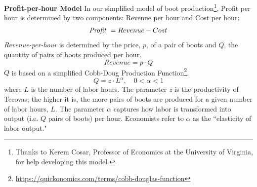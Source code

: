 \documentclass[11pt]{article}
\begin{document}
\pagestyle{otherpages}
\thispagestyle{firstpage}
\vspace*{.65in}



{\bf Profit-per-hour Model}
In our simplified model of boot production\footnote{Thanks to Kerem Cosar, Professor of Economics at the University of Virginia, for help developing this model.}, Profit per hour is determined by two components: Revenue per hour and Cost per hour:
$$\text{\em Profit }= Revenue - Cost$$
{\em Revenue-per-hour} is determined by the price, $p$, of a pair of boots and $Q$, the quantity  of pairs of boots produced  per hour. $$Revenue=p\cdot Q$$
$Q$ is based on a simplified Cobb-Doug Production Function\footnote{\url{https://quickonomics.com/terms/cobb-douglas-function}}.
$$Q=z\cdot L^{\alpha},\quad 0<\alpha<1$$ where $L$ is the number of labor hours.  The parameter $z$ is the productivity of Tecovas;  the higher it is, the more pairs of boots are produced for a given number of labor hours, $L$.  The parameter $\alpha$ captures how labor is transformed into output (i.e. $Q$ pairs of boots) per hour. Economists  refer to $\alpha$ as the ``elasticity of labor output."
\\
\end{document}

